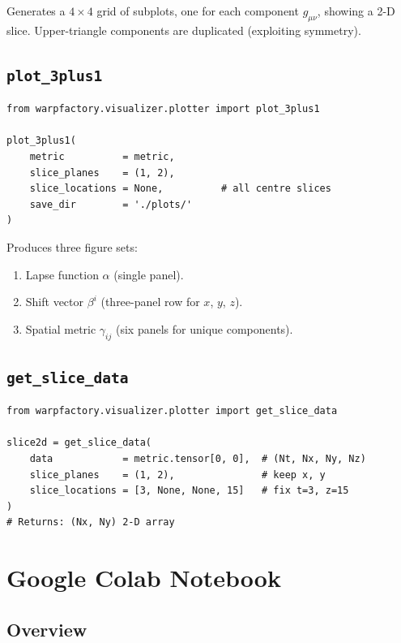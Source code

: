 \documentclass[11pt, a4paper, twoside]{report}
\begin{document}
Generates a $4\times4$ grid of subplots, one for each component
$g_{\mu\nu}$, showing a 2-D slice.  Upper-triangle components are
duplicated (exploiting symmetry).

\section{\texttt{plot\_3plus1}}

\begin{lstlisting}
from warpfactory.visualizer.plotter import plot_3plus1

plot_3plus1(
    metric          = metric,
    slice_planes    = (1, 2),
    slice_locations = None,          # all centre slices
    save_dir        = './plots/'
)
\end{lstlisting}

Produces three figure sets:
\begin{enumerate}
  \item Lapse function $\alpha$ (single panel).
  \item Shift vector $\beta^i$ (three-panel row for $x$, $y$, $z$).
  \item Spatial metric $\gamma_{ij}$ (six panels for unique components).
\end{enumerate}

\section{\texttt{get\_slice\_data}}

\begin{lstlisting}
from warpfactory.visualizer.plotter import get_slice_data

slice2d = get_slice_data(
    data            = metric.tensor[0, 0],  # (Nt, Nx, Ny, Nz)
    slice_planes    = (1, 2),               # keep x, y
    slice_locations = [3, None, None, 15]   # fix t=3, z=15
)
# Returns: (Nx, Ny) 2-D array
\end{lstlisting}

\chapter{Google Colab Notebook}
\label{chap:colab}

\section{Overview}
\end{document}
